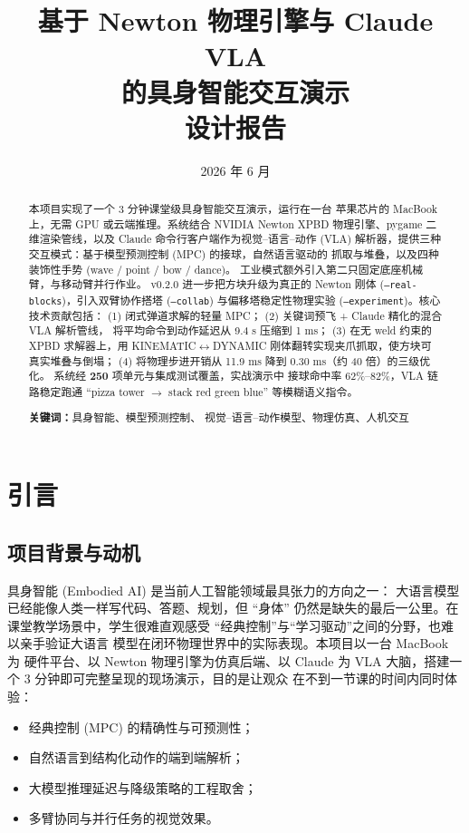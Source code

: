 \documentclass[12pt, a4paper, UTF8]{ctexart}
\title{\textbf{\Large 基于 Newton 物理引擎与 Claude VLA \\的具身智能交互演示}\\[8pt]
       \large 设计报告}
\author{}
\date{2026 年 6 月}
\begin{document}
\maketitle

\begin{abstract}
\noindent
本项目实现了一个 3 分钟课堂级具身智能交互演示，运行在一台
苹果芯片的 MacBook 上，无需 GPU 或云端推理。系统结合 NVIDIA
Newton XPBD 物理引擎、pygame 二维渲染管线，以及 Claude
命令行客户端作为视觉--语言--动作 (VLA) 解析器，提供三种
交互模式：基于模型预测控制 (MPC) 的接球，自然语言驱动的
抓取与堆叠，以及四种装饰性手势 (wave / point / bow / dance)。
工业模式额外引入第二只固定底座机械臂，与移动臂并行作业。
v0.2.0 进一步把方块升级为真正的 Newton 刚体
(\texttt{--real-blocks})，引入双臂协作搭塔 (\texttt{--collab})
与偏移塔稳定性物理实验 (\texttt{--experiment})。核心技术贡献包括：
(1) 闭式弹道求解的轻量 MPC；
(2) 关键词预飞 + Claude 精化的混合 VLA 解析管线，
将平均命令到动作延迟从 9.4 s 压缩到 1 ms；
(3) 在无 weld 约束的 XPBD 求解器上，用 KINEMATIC$\leftrightarrow$DYNAMIC
刚体翻转实现夹爪抓取，使方块可真实堆叠与倒塌；
(4) 将物理步进开销从 11.9 ms 降到 0.30 ms（约 40 倍）的三级优化。
系统经 \textbf{250} 项单元与集成测试覆盖，实战演示中
接球命中率 62\%--82\%，VLA 链路稳定跑通 ``pizza tower
\(\to\) stack red green blue'' 等模糊语义指令。

\medskip
\noindent\textbf{关键词：}\quad 具身智能、模型预测控制、
视觉--语言--动作模型、物理仿真、人机交互
\end{abstract}

\tableofcontents
\newpage

\section{引言}

\subsection{项目背景与动机}
具身智能 (Embodied AI) 是当前人工智能领域最具张力的方向之一：
大语言模型已经能像人类一样写代码、答题、规划，但 ``身体''
仍然是缺失的最后一公里。在课堂教学场景中，学生很难直观感受
``经典控制''与``学习驱动''之间的分野，也难以亲手验证大语言
模型在闭环物理世界中的实际表现。本项目以一台 MacBook 为
硬件平台、以 Newton 物理引擎为仿真后端、以 Claude 为 VLA
大脑，搭建一个 3 分钟即可完整呈现的现场演示，目的是让观众
在不到一节课的时间内同时体验：
\begin{itemize}[leftmargin=*, itemsep=0pt]
  \item 经典控制 (MPC) 的精确性与可预测性；
  \item 自然语言到结构化动作的端到端解析；
  \item 大模型推理延迟与降级策略的工程取舍；
  \item 多臂协同与并行任务的视觉效果。
\end{itemize}
\end{document}
